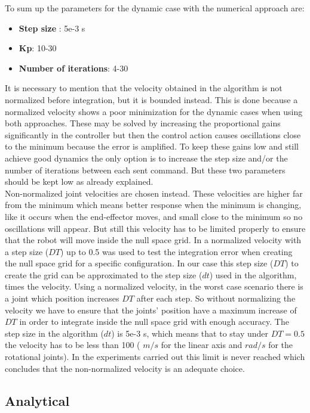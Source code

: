 To sum up the parameters for the dynamic case with the numerical approach are:
 \begin{itemize}  
 	\item \textbf{Step size} : 5e-3 s
 	\item \textbf{Kp}: 10-30
    \item \textbf{Number of iterations}: 4-30
  \end{itemize} 
 
It is necessary to mention that the velocity obtained in the algorithm is not normalized before  integration, but it is bounded instead. This is done because a normalized velocity shows a poor minimization for the dynamic cases when using both approaches. These may be solved by increasing the proportional gains significantly in the controller but then the control action causes oscillations close to the minimum because the error is  amplified. To keep these gains low and still achieve good dynamics the only option is to increase the step size and/or the number of iterations between each sent command. But these two parameters should be kept low as already explained. \\
Non-normalized joint velocities are chosen instead. These velocities are higher far from the minimum which means better response when the minimum is changing, like it occurs when the end-effector moves, and small close to the minimum so no oscillations will appear. But still this velocity has to be limited properly to ensure that the robot will move inside the null space grid.  In \cite{fabianthesis} a normalized velocity with a step size ($DT$) up to 0.5 was used to test the integration error when creating the null space grid for a specific configuration. 
In our case this step size ($DT$) to create the grid can be approximated to the step size ($dt$) used in the algorithm, times the velocity. Using a normalized velocity, in the worst case scenario there is a joint which position increases $DT$ after each step. So without normalizing the velocity we have to ensure that the joints' position have a maximum increase of $DT$ in order to integrate inside the null space grid with enough accuracy.
The step size in the algorithm ($dt$) is 5e-3 s, which means that to stay under $DT=0.5$ the velocity has to be less than 100 ( $m/s$ for the linear axis and $rad/s$ for the rotational joints). In the experiments carried out this limit is never reached which concludes that the non-normalized velocity is an adequate choice. 


\subsection{Analytical}

